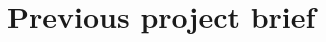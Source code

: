 \chapter{Previous project brief}
\label{Appendix:brief_prev}

\begin{figure}
\centering

\end{figure}

\clearpage
